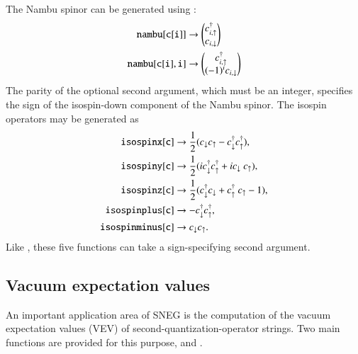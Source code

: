 \documentclass[3p,number,preprint]{elsarticle}
\begin{document}
The Nambu spinor can be generated using :
%
\begin{equation}
\begin{split}
{\tt nambu[c[i]]} &\to \begin{pmatrix} c^\dag_{i,\uparrow} \\
c_{i,\downarrow}
\end{pmatrix} \\
{\tt nambu[c[i],i]} &\to \begin{pmatrix}
c^\dag_{i,\uparrow} \\ (-1)^i c_{i,\downarrow} 
\end{pmatrix}
\end{split}
\end{equation}
%
The parity of the optional second argument, which must be an integer,
specifies the sign of the isospin-down component of the Nambu spinor.
The isospin operators may be generated as
%
\begin{equation}
\begin{split}
\mma{isospinx[c]} &\to 
\frac {1}{2} (c_{\downarrow} c_{\uparrow}-c^\dag_{\downarrow} 
c^\dag_{\uparrow}), \\
%
\mma{isospiny[c]} &\to
\frac{1}{2} (ic^\dag_{\downarrow} c^\dag_{\uparrow}+ic_{\downarrow} \
c_{\uparrow}), \\
%
\mma{isospinz[c]} &\to
\frac{1}{2} (c^\dag_{\downarrow} c_{\downarrow}+c^\dag_{\uparrow} \
c_{\uparrow}-1), \\
%
\mma{isospinplus[c]} &\to
-c^\dag_{\downarrow} c^\dag_{\uparrow}, \\
%
\mma{isospinminus[c]} &\to c_{\downarrow} c_{\uparrow}.
\end{split}
\end{equation}
%
Like , these five functions can take a sign-specifying
second argument.


\subsection{Vacuum expectation values}

An important application area of SNEG is the computation of the vacuum
expectation values (VEV) of second-quantization-operator strings. Two
main functions are provided for this purpose, \mma{vev} and
\mma{vevwick}.
\end{document}
